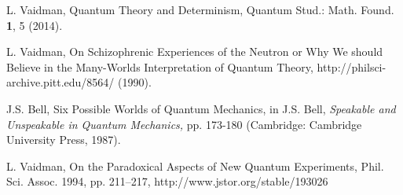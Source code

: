 \documentclass[11pt]{article}
\begin{document}
\begin{thebibliography}{99}
L. Vaidman,
Quantum Theory and Determinism,
Quantum Stud.: Math. Found. {\bf 1}, 5 (2014).

L. Vaidman,
 On Schizophrenic Experiences of the Neutron or Why We should Believe in the Many-Worlds Interpretation of Quantum Theory,
  http://philsci-archive.pitt.edu/8564/ (1990).


J.S. Bell,
 Six Possible Worlds of Quantum Mechanics,
 in J.S. Bell, {\it Speakable and Unspeakable in Quantum Mechanics,} pp. 173-180 (Cambridge: Cambridge University
Press, 1987).

L. Vaidman,   On the Paradoxical Aspects of New Quantum Experiments, Phil.  Sci.  Assoc. 1994, pp. 211–217, http://www.jstor.org/stable/193026



\end{thebibliography}
\end{document}
